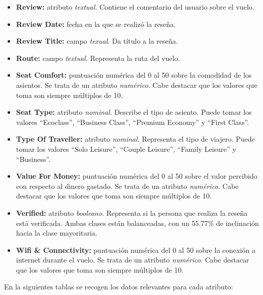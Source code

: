 \documentclass[12pt]{report} %
\begin{document}
\begin{itemize}
    \item \textbf{Review:} atributo \textit{textual}. Contiene el comentario del usuario sobre el vuelo.
    \item \textbf{Review Date:} fecha en la que se realizó la reseña.
    \item \textbf{Review Title:} campo \textit{texual}. Da título a la reseña. 
    \item \textbf{Route:} campo \textit{textual}. Representa la ruta del vuelo.
    \item \textbf{Seat Comfort:} puntuación numérica del 0 al 50 sobre la comodidad de los asientos. Se trata de un atributo \textit{numérico}. Cabe destacar que los valores que toma son siempre múltiplos de 10.
    \item \textbf{Seat Type:} atributo \textit{nominal}. Describe el tipo de asiento. Puede tomar los valores ``Ecoclass'',  ``Business Class'', ``Premium Economy'' y ``First Class''.  
    \item \textbf{Type Of Traveller:} atributo \textit{nominal}. Representa el tipo de viajero. Puede tomar los valores ``Solo Leisure'', ``Couple Leisure'', ``Family Leisure'' y ``Business''.
    \item \textbf{Value For Money:} puntuación numérica del 0 al 50 sobre el valor percibido con respecto al dinero gastado. Se trata de un atributo \textit{numérico}. Cabe destacar que los valores que toma son siempre múltiplos de 10.
    \item \textbf{Verified:} atributo \textit{booleano}. Representa si la persona que realiza la reseña está verificada. Ambas clases están balanceadas, con un 55.77\% de inclinación hacia la clase mayoritaria.
    \item \textbf{Wifi \& Connectivity:} puntuación numérica del 0 al 50 sobre la conexión a internet durante el vuelo. Se trata de un atributo \textit{numérico}. Cabe destacar que los valores que toma son siempre múltiplos de 10.
\end{itemize}
En la siguientes tablas se recogen los datos relevantes para cada atributo: 
\end{document}
